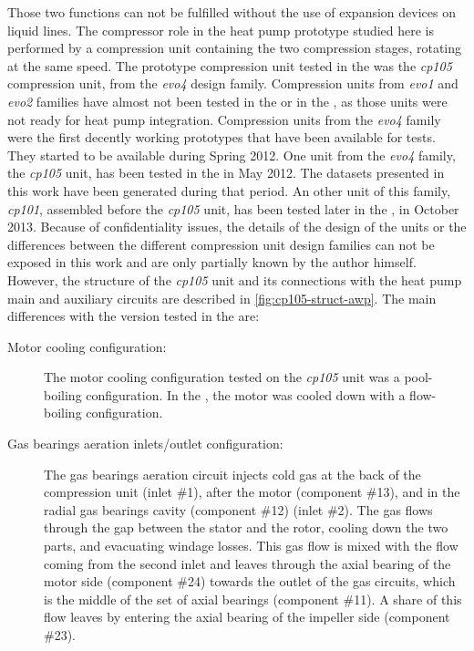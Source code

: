 Those two functions can not be fulfilled without the use of expansion
devices on liquid lines. The compressor role in the heat pump
prototype studied here is performed by a compression unit containing
the two compression stages, rotating at the same speed. The prototype
compression unit tested in the \AWP{} was the \textit{cp105}
compression unit, from the \textit{evo4} design family. Compression
units from \textit{evo1} and \textit{evo2} families have almost not
been tested in the \BWP{} or in the \AWP{}, as those units were not
ready for heat pump integration. Compression units from the
\textit{evo4} family were the first decently working prototypes that
have been available for tests. They
started to be available during Spring 2012. One unit from the
\textit{evo4} family, the \textit{cp105} unit, has been tested in the
\AWP{} in May 2012. The datasets presented in this work have been
generated during that period. An other unit of this family,
\textit{cp101}, assembled before the \textit{cp105} unit, has been
tested later in the \BWP{}, in October 2013. Because of
confidentiality issues, the details of the design of the units or the
differences between the different compression unit design families can
not be exposed in this work and are only partially known by the author
himself. However, the structure of the \textit{cp105} unit and its
connections with the heat pump main and auxiliary circuits are
described in \cref{fig:cp105-struct-awp}. The main differences with
the version tested in the \BWP{} are:

\begin{description}
\item[Motor cooling configuration:] The motor cooling configuration
  tested on the \textit{cp105} unit was a pool-boiling
  configuration. In the \BWP{}, the motor was cooled down with a
  flow-boiling configuration.
\item[Gas bearings aeration inlets/outlet configuration:] The gas
  bearings aeration circuit injects cold gas at the back of the
  compression unit (inlet \#1), after the motor (component
  \#13), and in the radial gas
  bearings cavity (component \#12)
  (inlet \#2). The gas flows through the gap between the stator and
  the rotor, cooling down the two parts, and evacuating windage
  losses. This gas flow is mixed with the flow coming from the second
  inlet and leaves through the axial bearing of the motor
  side (component \#24) towards the
  outlet of the gas circuits, which is the middle of the set of axial
  bearings (component \#11). A share of
  this flow leaves by entering the axial bearing of the impeller
  side (component \#23).
\end{description}


